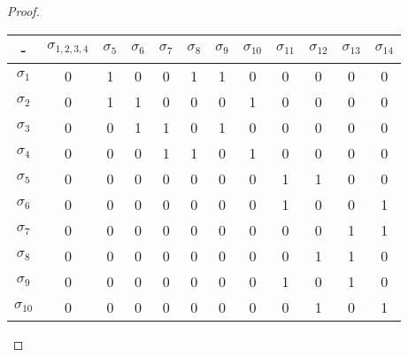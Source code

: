 \begin{proof}
\begin{enumerate}
    \begin{center}
        \begin{tabular}{|c|c|c|c|c|c|c|c|c|c|c|c|}
            \hline
            -             & $\sigma_{1,2,3,4}$ & $\sigma_5$ & $\sigma_6$ & $\sigma_7$ & $\sigma_8$ & $\sigma_9$ & $\sigma_{10}$ & $\sigma_{11}$ & $\sigma_{12}$ & $\sigma_{13}$ & $\sigma_{14}$ \\ \hline
            $\sigma_1$    & 0                  & 1          & 0          & 0          & 1          & 1          & 0             & 0             & 0             & 0             & 0             \\ \hline
            $\sigma_2$    & 0                  & 1          & 1          & 0          & 0          & 0          & 1             & 0             & 0             & 0             & 0             \\ \hline
            $\sigma_3$    & 0                  & 0          & 1          & 1          & 0          & 1          & 0             & 0             & 0             & 0             & 0             \\ \hline
            $\sigma_4$    & 0                  & 0          & 0          & 1          & 1          & 0          & 1             & 0             & 0             & 0             & 0             \\ \hline
            $\sigma_5$    & 0                  & 0          & 0          & 0          & 0          & 0          & 0             & 1             & 1             & 0             & 0             \\ \hline
            $\sigma_6$    & 0                  & 0          & 0          & 0          & 0          & 0          & 0             & 1             & 0             & 0             & 1             \\ \hline
            $\sigma_7$    & 0                  & 0          & 0          & 0          & 0          & 0          & 0             & 0             & 0             & 1             & 1             \\ \hline
            $\sigma_8$    & 0                  & 0          & 0          & 0          & 0          & 0          & 0             & 0             & 1             & 1             & 0             \\ \hline
            $\sigma_9$    & 0                  & 0          & 0          & 0          & 0          & 0          & 0             & 1             & 0             & 1             & 0             \\ \hline
            $\sigma_{10}$ & 0                  & 0          & 0          & 0          & 0          & 0          & 0             & 0             & 1             & 0             & 1             \\ \hline

\end{tabular}
\end{center}
\end{enumerate}
\end{proof}
